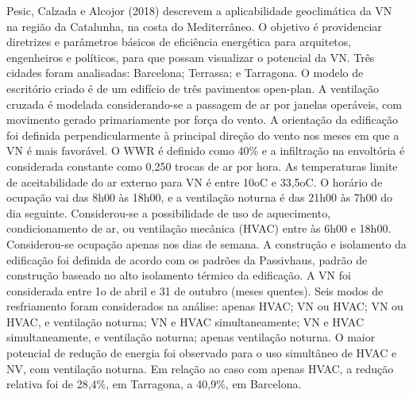 \documentclass[brazil,hardcopy,openany,a5paper]{ufscthesis}
\begin{document}
	Pesic, Calzada e Alcojor (2018) descrevem a aplicabilidade geoclimática da VN na região da Catalunha, na costa do Mediterrâneo. O objetivo é providenciar diretrizes e parâmetros básicos de eficiência energética para arquitetos, engenheiros e políticos, para que possam visualizar o potencial da VN. Três cidades foram analisadas: Barcelona; Terrassa; e Tarragona. O modelo de escritório criado é de um edifício de três pavimentos open-plan. A ventilação cruzada é modelada considerando-se a passagem de ar por janelas operáveis, com movimento gerado primariamente por força do vento. A orientação da edificação foi definida perpendicularmente à principal direção do vento nos 	meses em que a VN é mais favorável. O WWR é definido como 40\% e a infiltração na envoltória é considerada constante como 0,250 trocas de ar por hora. As temperaturas limite de aceitabilidade do ar externo para VN é entre 10oC e 33,5oC. O horário de ocupação vai das 8h00 às 18h00, e a ventilação noturna é das 21h00 às 7h00 do dia seguinte. Considerou-se a possibilidade de uso de aquecimento, condicionamento de ar, ou ventilação mecânica (HVAC) entre às 6h00 e 18h00. Considerou-se ocupação apenas nos dias de semana. A construção e isolamento da edificação foi definida de acordo com os padrões da Passivhaus, padrão de construção baseado no alto isolamento térmico da edificação. A VN foi considerada entre 1o de abril e 31 de outubro (meses quentes). Seis modos de resfriamento foram considerados na análise: apenas HVAC; VN ou HVAC; VN ou HVAC, e ventilação noturna; VN e HVAC simultaneamente; VN e HVAC simultaneamente, e ventilação noturna; apenas ventilação noturna. O maior potencial de redução de energia foi observado para o uso simultâneo de HVAC e NV, com ventilação noturna. Em relação ao caso com apenas HVAC, a redução relativa foi de 28,4\%, em Tarragona, a 40,9\%, em Barcelona.
	
\end{document}
